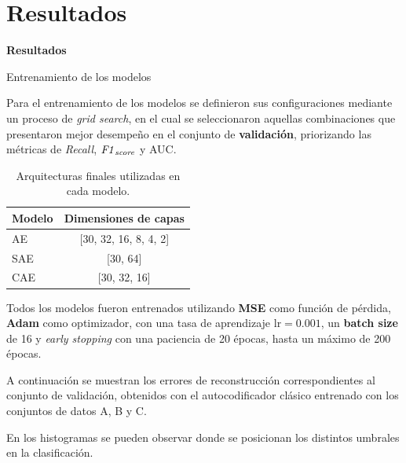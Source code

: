 \documentclass{beamer}
\begin{document}
\section{Resultados}

\begin{frame}
	\begin{center}
		\textcolor{unahurverde}{\textbf{Resultados}}
	\end{center}
	\centering

\end{frame}

\begin{frame}{Entrenamiento de los modelos}
	\small
	\justifying
	
	\begin{block}{}
		Para el entrenamiento de los modelos se definieron sus configuraciones mediante un proceso de \emph{grid search}, en el cual se seleccionaron aquellas combinaciones que presentaron mejor desempeño en el conjunto de \textbf{validación}, priorizando las métricas de \emph{Recall}, $\text{\emph{F1}}_{\text{\emph{score}}}$ y AUC.
	\end{block}
	
	\vspace{0.2cm}
	
	\begin{table}
		\centering
		\caption{Arquitecturas finales utilizadas en cada modelo.}
		\begin{tabular}{lc}
			\toprule
			\textbf{Modelo} & \textbf{Dimensiones de capas} \\
			\midrule
			AE  & [30, 32, 16, 8, 4, 2] \\
			SAE & [30, 64] \\
			CAE & [30, 32, 16] \\
			\bottomrule
		\end{tabular}
	\end{table}
	
	\begin{block}{}
		Todos los modelos fueron entrenados utilizando \textbf{MSE} como función de pérdida, \textbf{Adam} como optimizador, con una tasa de aprendizaje $\text{lr}=0.001$, un \textbf{batch size} de 16 y \emph{early stopping} con una paciencia de 20 épocas, hasta un máximo de 200 épocas.
	\end{block}
\end{frame}



\begin{frame}
	\begin{block}{}
		A continuación se muestran los errores de reconstrucción correspondientes al conjunto de validación, obtenidos con el autocodificador clásico entrenado con los conjuntos de datos A, B y C.
	\end{block}
	
	\begin{block}{}
		En los histogramas se pueden observar donde se posicionan los distintos umbrales en la clasificación.
	\end{block}
\end{frame}
\end{document}
